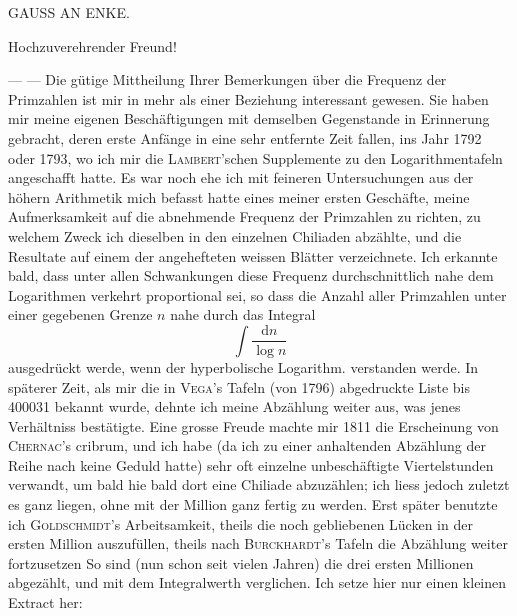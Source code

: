 \clearpage
{}%
\renewcommand{\BookRunningTitle}{Gauss an Enke}
\begingroup
\begin{center}{\large GAUSS AN ENKE.}\end{center}
\begin{center}Hochzuverehrender Freund!\end{center}

— — Die gütige Mittheilung Ihrer Bemerkungen über die Frequenz der Primzahlen ist mir in mehr als einer Beziehung interessant gewesen. Sie haben mir meine eigenen Beschäftigungen mit demselben Gegenstande in Erinnerung gebracht, deren erste Anfänge in eine sehr entfernte Zeit fallen, ins Jahr 1792 oder 1793, wo ich mir die \textsc{Lambert}’schen Supplemente zu den Logarithmentafeln angeschafft hatte. Es war noch ehe ich mit feineren Untersuchungen aus der höhern Arithmetik mich befasst hatte eines meiner ersten Geschäfte, meine Aufmerksamkeit auf die abnehmende Frequenz der Primzahlen zu richten, zu welchem Zweck ich dieselben in den einzelnen Chiliaden abzählte, und die Resultate auf einem der angehefteten weissen Blätter verzeichnete. Ich erkannte bald, dass unter allen Schwankungen diese Frequenz durchschnittlich nahe dem Logarithmen verkehrt proportional sei, so dass die Anzahl aller Primzahlen unter einer gegebenen Grenze $n$ nahe durch das Integral
\[
\int\frac{\mathrm{d}n}{\log n}
\]
ausgedrückt werde, wenn der hyperbolische Logarithm. verstanden werde. In späterer Zeit, als mir die in \textsc{Vega}’s Tafeln (von 1796) abgedruckte Liste bis 400031 bekannt wurde, dehnte ich meine Abzählung weiter aus, was jenes Verhältniss bestätigte. Eine grosse Freude machte mir 1811 die Erscheinung von \textsc{Chernac}’s
%
cribrum, und ich habe (da ich zu einer anhaltenden Abzählung der Reihe nach keine Geduld hatte) sehr oft einzelne unbeschäftigte Viertelstunden verwandt, um bald hie bald dort eine Chiliade abzuzählen; ich liess jedoch zuletzt es ganz liegen, ohne mit der Million ganz fertig zu werden. Erst später benutzte ich \textsc{Goldschmidt}’s Arbeitsamkeit, theils die noch gebliebenen Lücken in der ersten Million auszufüllen, theils nach \textsc{Burck\-hardt}’s Tafeln die Abzählung weiter fortzusetzen So sind (nun schon seit vielen Jahren) die drei ersten Millionen abgezählt, und mit dem Integralwerth verglichen. Ich setze hier nur einen kleinen Extract her:

